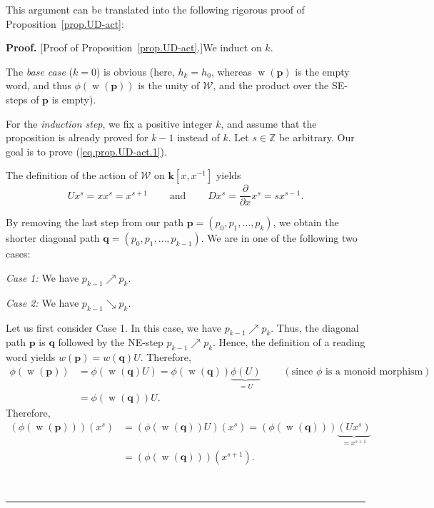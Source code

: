 \documentclass[numbers=enddot,12pt,final,onecolumn,notitlepage]{scrartcl}%
\theoremstyle{definition}
\newenvironment{proof}[1][Proof]{\noindent\textbf{#1.} }{\ \rule{0.5em}{0.5em}}
\newcommand{\W}{\mathcal{W}}
\newcommand{\kk}{\mathbf{k}}
\newcommand{\ZZ}{\mathbb{Z}}
\newcommand{\pp}{\mathbf{p}}
\newcommand{\qq}{\mathbf{q}}
\newcommand{\w}{\operatorname{w}}
\newenvironment{verlong}{}{}
\begin{document}
\begin{verlong}
This argument can be translated into the following rigorous proof of
Proposition~\ref{prop.UD-act}:

\begin{proof}
[Proof of Proposition~\ref{prop.UD-act}.]We induct on $k$.

The \textit{base case} ($k=0$) is obvious (here, $h_{k}=h_{0}$, whereas
$\w\left(  \pp\right)  $ is the empty word, and thus
$\phi\left(  \w\left(  \pp\right)  \right)  $ is the
unity of $\W$, and the product over the SE-steps of $\pp$ is empty).

For the \textit{induction step}, we fix a positive integer $k$, and assume
that the proposition is already proved for $k-1$ instead of $k$. Let
$s\in\ZZ$ be arbitrary. Our goal is to prove (\ref{eq.prop.UD-act.1}).

The definition of the action of $\W$ on $\kk\left[
x,x^{-1}\right]  $ yields%
\[
Ux^{s}=xx^{s}=x^{s+1}\ \ \ \ \ \ \ \ \ \ \text{and}\ \ \ \ \ \ \ \ \ \ Dx^{s}%
=\dfrac{\partial}{\partial x}x^{s}=sx^{s-1}.
\]


By removing the last step from our path $\pp=\left(  p_{0},p_{1}%
,\ldots,p_{k}\right)  $, we obtain the shorter diagonal path $\qq%
=\left(  p_{0},p_{1},\ldots,p_{k-1}\right)  $. We are in one of the following
two cases:

\textit{Case 1:} We have $p_{k-1}\nearrow p_{k}$.

\textit{Case 2:} We have $p_{k-1}\searrow p_{k}$.

Let us first consider Case 1. In this case, we have $p_{k-1}\nearrow p_{k}$.
Thus, the diagonal path $\pp$ is $\qq$ followed by the NE-step
$p_{k-1}\nearrow p_{k}$. Hence, the definition of a reading word yields
$w\left(  \pp\right)  =w\left(  \qq\right)  U$. Therefore,
\begin{align}
\phi\left(  \w\left(  \pp\right)  \right)   &
=\phi\left(  \w\left(  \qq\right)  U\right)
=\phi\left(  \w\left(  \qq\right)  \right)
\underbrace{\phi\left(  U\right)  }_{=U}\ \ \ \ \ \ \ \ \ \ \left(
\text{since }\phi\text{ is a monoid morphism}\right)  \nonumber\\
&  =\phi\left(  \w\left(  \qq\right)  \right)
U.\label{pf.prop.UD-act.2}%
\end{align}
Therefore,%
\begin{align}
\left(  \phi\left(  \w\left(  \pp\right)  \right)
\right)  \left(  x^{s}\right)   &  =\left(  \phi\left(  \w%
\left(  \qq\right)  \right)  U\right)  \left(  x^{s}\right)  =\left(
\phi\left(  \w\left(  \qq\right)  \right)  \right)
\underbrace{\left(  Ux^{s}\right)  }_{=x^{s+1}}\nonumber\\
&  =\left(  \phi\left(  \w\left(  \qq\right)  \right)
\right)  \left(  x^{s+1}\right)  .\label{pf.prop.UD-act.3}%
\end{align}



\end{proof}
\end{verlong}
\end{document}
